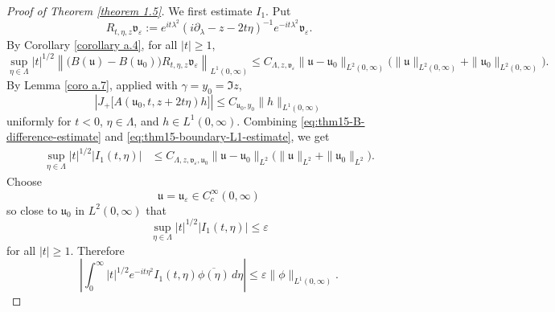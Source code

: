 \documentclass[10pt]{article}
\numberwithin{equation}{section}
\numberwithin{theorem}{section}
\begin{document}
\begin{proof}[Proof of Theorem \ref{theorem 1.5}]
We first estimate \(I_1\). Put
\[
R_{t,\eta,z}\mathfrak v_\varepsilon
:=
e^{it\lambda^2}
(i\partial_\lambda-z-2t\eta)^{-1}
e^{-it\lambda^2}\mathfrak v_\varepsilon.
\]
By Corollary \ref{corollary a.4}, for all \(|t|\ge1\),
\begin{equation}
\label{eq:thm15-B-difference-estimate}
\sup_{\eta\in\Lambda}
|t|^{1/2}
\left\|
\bigl(B(\mathfrak u)-B(\mathfrak u_0)\bigr)
R_{t,\eta,z}\mathfrak v_\varepsilon
\right\|_{L^1(0,\infty)}
\le
C_{\Lambda,z,\mathfrak v_\varepsilon}
\|\mathfrak u-\mathfrak u_0\|_{L^2(0,\infty)}
\bigl(
\|\mathfrak u\|_{L^2(0,\infty)}
+
\|\mathfrak u_0\|_{L^2(0,\infty)}
\bigr).
\end{equation}
By Lemma \ref{coro a.7}, applied with \(\gamma=y_0=\Im z\),
\begin{equation}
\label{eq:thm15-boundary-L1-estimate}
\left|
J_+\bigl[A(\mathfrak u_0,t,z+2t\eta)h\bigr]
\right|
\le
C_{\mathfrak u_0,y_0}\|h\|_{L^1(0,\infty)}
\end{equation}
uniformly for \(t<0\), \(\eta\in\Lambda\), and \(h\in L^1(0,\infty)\). Combining
\eqref{eq:thm15-B-difference-estimate} and \eqref{eq:thm15-boundary-L1-estimate}, we get
\begin{equation}
\label{eq:thm15-I1-bound}
\begin{aligned}
\sup_{\eta\in\Lambda}
|t|^{1/2}|I_1(t,\eta)|
&\le
C_{\Lambda,z,\mathfrak v_\varepsilon,\mathfrak u_0}
\|\mathfrak u-\mathfrak u_0\|_{L^2}
\bigl(
\|\mathfrak u\|_{L^2}+\|\mathfrak u_0\|_{L^2}
\bigr).
\end{aligned}
\end{equation}
Choose
\[
\mathfrak u=\mathfrak u_\varepsilon\in C_c^\infty(0,\infty)
\]
so close to \(\mathfrak u_0\) in \(L^2(0,\infty)\) that
\begin{equation}
\label{eq:thm15-I1-eps-bound}
\sup_{\eta\in\Lambda}|t|^{1/2}|I_1(t,\eta)|
\le\varepsilon
\end{equation}
for all \(|t|\ge1\). Therefore
\begin{equation}
\label{eq:thm15-I1-test-bound}
\left|
\int_0^\infty
|t|^{1/2}e^{-it\eta^2}
I_1(t,\eta)\overline{\phi(\eta)}\,d\eta
\right|
\le
\varepsilon\|\phi\|_{L^1(0,\infty)}.
\end{equation}


\end{proof}
\end{document}
